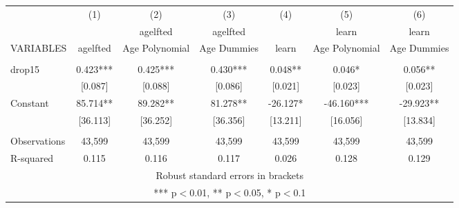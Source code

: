 \documentclass[]{article}
\begin{document}
\begin{tabular}{lcccccc} \hline
 & (1) & (2) & (3) & (4) & (5) & (6) \\
 &  & agelfted & agelfted &  & learn & learn \\
VARIABLES & agelfted & Age Polynomial & Age Dummies & learn & Age Polynomial & Age Dummies \\ \hline
 &  &  &  &  &  &  \\
drop15 & 0.423*** & 0.425*** & 0.430*** & 0.048** & 0.046* & 0.056** \\
 & [0.087] & [0.088] & [0.086] & [0.021] & [0.023] & [0.023] \\
Constant & 85.714** & 89.282** & 81.278** & -26.127* & -46.160*** & -29.923** \\
 & [36.113] & [36.252] & [36.356] & [13.211] & [16.056] & [13.834] \\
 &  &  &  &  &  &  \\
Observations & 43,599 & 43,599 & 43,599 & 43,599 & 43,599 & 43,599 \\
 R-squared & 0.115 & 0.116 & 0.117 & 0.026 & 0.128 & 0.129 \\ \hline
\multicolumn{7}{c}{ Robust standard errors in brackets} \\
\multicolumn{7}{c}{ *** p$<$0.01, ** p$<$0.05, * p$<$0.1} \\
\end{tabular}
\end{document}
